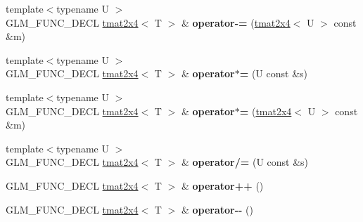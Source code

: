 \begin{DoxyCompactItemize}
\item 
\hypertarget{structglm_1_1detail_1_1tmat2x4_a61a215f6a9add582e906dba9c363d15e}{}{\footnotesize template$<$typename U $>$ }\\G\+L\+M\+\_\+\+F\+U\+N\+C\+\_\+\+D\+E\+C\+L \hyperlink{structglm_1_1detail_1_1tmat2x4}{tmat2x4}$<$ T $>$ \& {\bfseries operator-\/=} (\hyperlink{structglm_1_1detail_1_1tmat2x4}{tmat2x4}$<$ U $>$ const \&m)\label{structglm_1_1detail_1_1tmat2x4_a61a215f6a9add582e906dba9c363d15e}

\item 
\hypertarget{structglm_1_1detail_1_1tmat2x4_a179dd28345527b13581fea3cbf777a1f}{}{\footnotesize template$<$typename U $>$ }\\G\+L\+M\+\_\+\+F\+U\+N\+C\+\_\+\+D\+E\+C\+L \hyperlink{structglm_1_1detail_1_1tmat2x4}{tmat2x4}$<$ T $>$ \& {\bfseries operator$\ast$=} (U const \&s)\label{structglm_1_1detail_1_1tmat2x4_a179dd28345527b13581fea3cbf777a1f}

\item 
\hypertarget{structglm_1_1detail_1_1tmat2x4_a12a4c46c44545ccf5dcd7c88af5c40aa}{}{\footnotesize template$<$typename U $>$ }\\G\+L\+M\+\_\+\+F\+U\+N\+C\+\_\+\+D\+E\+C\+L \hyperlink{structglm_1_1detail_1_1tmat2x4}{tmat2x4}$<$ T $>$ \& {\bfseries operator$\ast$=} (\hyperlink{structglm_1_1detail_1_1tmat2x4}{tmat2x4}$<$ U $>$ const \&m)\label{structglm_1_1detail_1_1tmat2x4_a12a4c46c44545ccf5dcd7c88af5c40aa}

\item 
\hypertarget{structglm_1_1detail_1_1tmat2x4_a88d10ace55666225b70d7f2cdd05d784}{}{\footnotesize template$<$typename U $>$ }\\G\+L\+M\+\_\+\+F\+U\+N\+C\+\_\+\+D\+E\+C\+L \hyperlink{structglm_1_1detail_1_1tmat2x4}{tmat2x4}$<$ T $>$ \& {\bfseries operator/=} (U const \&s)\label{structglm_1_1detail_1_1tmat2x4_a88d10ace55666225b70d7f2cdd05d784}

\item 
\hypertarget{structglm_1_1detail_1_1tmat2x4_aad6b04f50e7c4a7e4f3ccb22c0a4045d}{}G\+L\+M\+\_\+\+F\+U\+N\+C\+\_\+\+D\+E\+C\+L \hyperlink{structglm_1_1detail_1_1tmat2x4}{tmat2x4}$<$ T $>$ \& {\bfseries operator++} ()\label{structglm_1_1detail_1_1tmat2x4_aad6b04f50e7c4a7e4f3ccb22c0a4045d}

\item 
\hypertarget{structglm_1_1detail_1_1tmat2x4_a39cc3e39c18aab49e20b7188606bc261}{}G\+L\+M\+\_\+\+F\+U\+N\+C\+\_\+\+D\+E\+C\+L \hyperlink{structglm_1_1detail_1_1tmat2x4}{tmat2x4}$<$ T $>$ \& {\bfseries operator-\/-\/} ()\label{structglm_1_1detail_1_1tmat2x4_a39cc3e39c18aab49e20b7188606bc261}


\end{DoxyCompactItemize}
